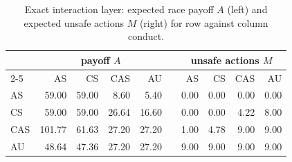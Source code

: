 \begin{table}[pos=t]
\centering
\caption{Exact interaction layer: expected race payoff $A$ (left) and expected unsafe actions $M$ (right) for row against column conduct.}
\label{tab:race}
\small
\begin{tabular}{lrrrrcrrrr}
\toprule
 & \multicolumn{4}{c}{payoff $A$} & & \multicolumn{4}{c}{unsafe actions $M$} \\
\cmidrule{2-5}\cmidrule{7-10}
 & AS & CS & CAS & AU & & AS & CS & CAS & AU \\
\midrule
AS & 59.00 & 59.00 & 8.60 & 5.40 & & 0.00 & 0.00 & 0.00 & 0.00 \\
CS & 59.00 & 59.00 & 26.64 & 16.60 & & 0.00 & 0.00 & 4.22 & 8.00 \\
CAS & 101.77 & 61.63 & 27.20 & 27.20 & & 1.00 & 4.78 & 9.00 & 9.00 \\
AU & 48.64 & 47.36 & 27.20 & 27.20 & & 9.00 & 9.00 & 9.00 & 9.00 \\
\bottomrule
\end{tabular}
\end{table}
